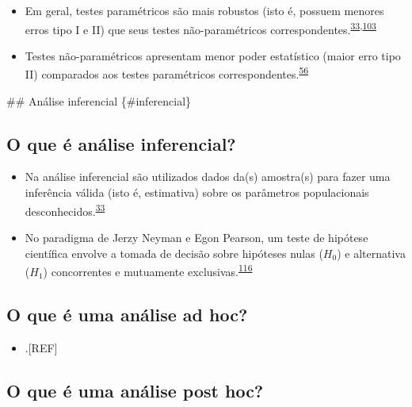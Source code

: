 \documentclass[
  a4paper,
]{book}
\providecommand{\tightlist}{%
  \setlength{\itemsep}{0pt}\setlength{\parskip}{0pt}}
\begin{document}
\begin{itemize}
\item
  Em geral, testes paramétricos são mais robustos (isto é, possuem menores erros tipo I e II) que seus testes não-paramétricos correspondentes.\textsuperscript{\protect\hyperlink{ref-vetter2017}{33},\protect\hyperlink{ref-greenhalgh1997}{103}}
\item
  Testes não-paramétricos apresentam menor poder estatístico (maior erro tipo II) comparados aos testes paramétricos correspondentes.\textsuperscript{\protect\hyperlink{ref-Ali2016}{56}}
\end{itemize}

\#\# Análise inferencial \{\#inferencial\}

\hypertarget{o-que-uxe9-anuxe1lise-inferencial}{%
\subsection{O que é análise inferencial?}\label{o-que-uxe9-anuxe1lise-inferencial}}

\begin{itemize}
\item
  Na análise inferencial são utilizados dados da(s) amostra(s) para fazer uma inferência válida (isto é, estimativa) sobre os parâmetros populacionais desconhecidos.\textsuperscript{\protect\hyperlink{ref-vetter2017}{33}}
\item
  No paradigma de Jerzy Neyman e Egon Pearson, um teste de hipótese científica envolve a tomada de decisão sobre hipóteses nulas (\(H_{0}\)) e alternativa (\(H_{1}\)) concorrentes e mutuamente exclusivas.\textsuperscript{\protect\hyperlink{ref-Curran-Everett2009}{116}}
\end{itemize}

\hypertarget{o-que-uxe9-uma-anuxe1lise-ad-hoc}{%
\subsection{O que é uma análise ad hoc?}\label{o-que-uxe9-uma-anuxe1lise-ad-hoc}}

\begin{itemize}
\tightlist
\item
  .{[}REF{]}
\end{itemize}

\hypertarget{o-que-uxe9-uma-anuxe1lise-post-hoc}{%
\subsection{O que é uma análise post hoc?}\label{o-que-uxe9-uma-anuxe1lise-post-hoc}}
\end{document}
